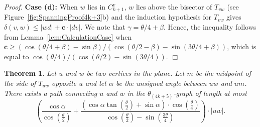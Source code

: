 \documentclass[12pt]{article}
\newtheorem{theo}[defin]{Theorem}
\newenvironment{theorem}{\begin{theo} \sl}{\end{theo}}
\newenvironment{proof}{\emph{Proof.}}{\hfill $\Box$\\}
\newcommand{\graph}[1]{\ensuremath{\theta_{(4 k + #1)}}-graph\xspace}
\newcommand{\canon}[2]{\ensuremath{T_{#1 #2}}}
\newcommand{\const}{\ensuremath{\boldsymbol{c}}\xspace}
\begin{document}
\begin{proof}
  \textbf{Case (d):} When $w$ lies in $C_{k+1}^v$, $w$ lies above the bisector of \canon{v}{w} (see Figure~\ref{fig:SpanningProof4k+3}b) and the induction hypothesis for \canon{v}{w} gives $\delta(v, w) \leq |w d| + \const \cdot |d v|$. We note that $\gamma = \theta/4 + \beta$. Hence, the inequality follows from Lemma~\ref{lem:CalculationCase} when $\const \geq (\cos (\theta/4 + \beta) - \sin \beta) / (\cos (\theta/2 - \beta) - \sin (3\theta/4 + \beta))$, which is equal to $\cos (\theta/4) / (\cos (\theta/2) - \sin (3\theta/4))$. 
\end{proof}

\begin{theorem}
  \label{theo:PathLength4k+5}
  Let $u$ and $w$ be two vertices in the plane. Let $m$ be the midpoint of the side of \canon{u}{w} opposite $u$ and let $\alpha$ be the unsigned angle between $u w$ and $u m$. There exists a path connecting $u$ and $w$ in the \graph{5} of length at most 
  \[\left( \frac{\cos \alpha}{\cos \left(\frac{\theta}{2}\right)} + \frac{\left( \cos \alpha \tan \left(\frac{\theta}{2}\right) + \sin \alpha \right) \cdot \cos \left(\frac{\theta}{4}\right)}{\cos \left(\frac{\theta}{2}\right) - \sin \left(\frac{3\theta}{4}\right)} \right) \cdot |u w|.\] 
\end{theorem}
\end{document}
